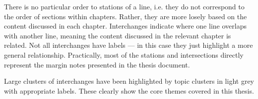 \begin{figure}
\end{figure}

There is no particular order to stations of a line, i.e. they do not correspond to the order of sections within chapters. Rather, they are more losely based on the content discussed in each chapter. Interchanges indicate where one line overlaps with another line, meaning the content discussed in the relevant chapter is related. Not all interchanges have labels --- in this case they just highlight a more general relationship. Practically, most of the stations and intersections directly represent the margin notes presented in the thesis document.

Large clusters of interchanges have been highlighted by topic clusters in light grey with appropriate labels. These clearly show the core themes covered in this thesis.

